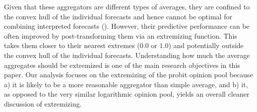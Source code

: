 \documentclass[11pt]{article}
\theoremstyle{definition}
\theoremstyle{definition}
\begin{document}
Given that these aggregators are different types of averages, they are confined to the convex hull of the individual forecasts and hence cannot be optimal for combining interpreted forecasts (\cite{parunak2013characterizing}). However, their predictive performance can be often improved by post-transforming them via an extremizing function. This takes them closer to their nearest extremes ($0.0$ or $1.0$) and potentially  outside the convex hull of the individual forecasts. Understanding how much the average aggregates should be extremized is one of the main research objectives in this paper. Our analysis focuses on the extremizing of the probit opinion pool because a) it is likely to be a more reasonable aggregator than simple average, and b) it, as opposed to the very similar logarithmic opinion pool, yields an overall cleaner discussion  of extremizing. 



\end{document}
